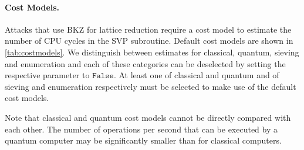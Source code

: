 \paragraph{Cost Models.} Attacks that use BKZ for lattice reduction require a cost model to estimate the number of CPU cycles in the SVP subroutine. Default cost models are shown in \cref{tab:costmodels}. We distinguish between estimates for classical, quantum, sieving and enumeration and each of these categories can be deselected by setting the respective parameter to $\texttt{False}$. At least one of classical and quantum and of sieving and enumeration respectively must be selected to make use of the default cost models.

Note that classical and quantum cost models cannot be directly compared with each other. The number of operations per second that can be executed by a quantum computer may be significantly smaller than for classical computers. %

